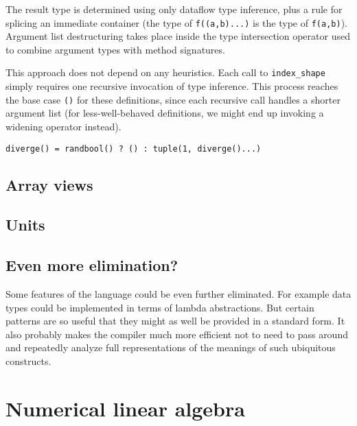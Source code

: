 The result type is determined using only dataflow type inference, plus a
rule for splicing an immediate container (the type of \texttt{f((a,b)...)} is
the type of \texttt{f(a,b)}). Argument list destructuring takes place inside
the type intersection operator used to combine argument types with method
signatures.

This approach does not depend on any heuristics. Each call to \texttt{index\_shape}
simply requires one recursive invocation of type inference. This process reaches
the base case \texttt{()} for these definitions, since each recursive call
handles a shorter argument list (for less-well-behaved definitions, we might
end up invoking a widening operator instead).


\begin{verbatim}
diverge() = randbool() ? () : tuple(1, diverge()...)
\end{verbatim}

\subsection{Array views}

\subsection{Units}

\subsection{Even more elimination?}

Some features of the language could be even further eliminated. For example data
types could be implemented in terms of lambda abstractions. But certain patterns
are so useful that they might as well be provided in a standard form. It also
probably makes the compiler much more efficient not to need to pass around and
repeatedly analyze full representations of the meanings of such ubiquitous constructs.


\section{Numerical linear algebra}
\label{sec:linalg}

